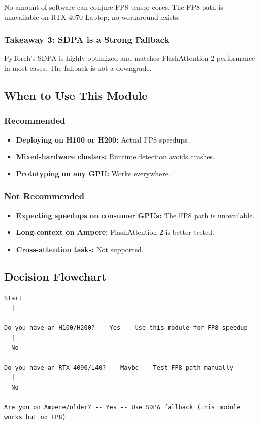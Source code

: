 No amount of software can conjure FP8 tensor cores. The FP8 path is 
unavailable on RTX 4070 Laptop; no workaround exists.

\subsubsection{Takeaway 3: SDPA is a Strong Fallback}

PyTorch's SDPA is highly optimized and matches FlashAttention-2 performance 
in most cases. The fallback is not a downgrade.

\subsection{When to Use This Module}

\subsubsection{Recommended}

\begin{itemize}
\item \textbf{Deploying on H100 or H200:} Actual FP8 speedups.
\item \textbf{Mixed-hardware clusters:} Runtime detection avoids crashes.
\item \textbf{Prototyping on any GPU:} Works everywhere.

\end{itemize}
\subsubsection{Not Recommended}

\begin{itemize}
\item \textbf{Expecting speedups on consumer GPUs:} The FP8 path is unavailable.
\item \textbf{Long-context on Ampere:} FlashAttention-2 is better tested.
\item \textbf{Cross-attention tasks:} Not supported.

\end{itemize}
\subsection{Decision Flowchart}

\begin{lstlisting}
Start
  |
   
Do you have an H100/H200? -- Yes -- Use this module for FP8 speedup
  |
  No
   
Do you have an RTX 4090/L40? -- Maybe -- Test FP8 path manually
  |
  No
   
Are you on Ampere/older? -- Yes -- Use SDPA fallback (this module works but no FP8)
\end{lstlisting}

